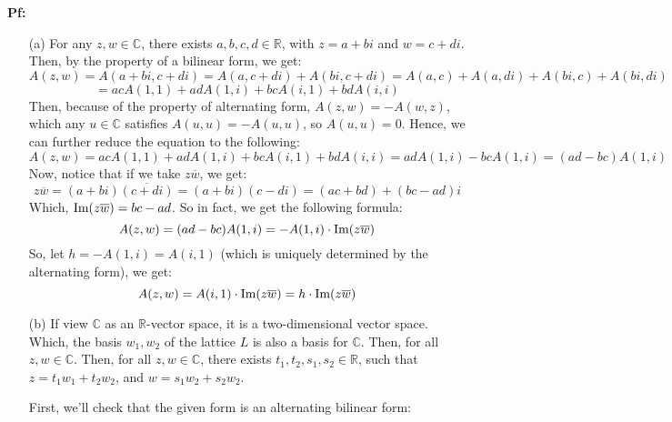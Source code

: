 \documentclass{article}
\begin{document}
\textbf{Pf:}
\begin{itemize}
    \item[(a)] For any $z,w\in \mathbb{C}$, there exists $a,b,c,d\in\mathbb{R}$, with $z=a+bi$ and $w=c+di$. Then, by the property of a bilinear form, we get:
    $$A(z,w)=A(a+bi,c+di) = A(a,c+di)+A(bi,c+di) = A(a,c)+A(a,di)+A(bi,c)+A(bi,di)$$
    $$ = acA(1,1)+adA(1,i)+bcA(i,1)+bdA(i,i)$$
    Then, because of the property of alternating form, $A(z,w)=-A(w,z)$, which any $u\in\mathbb{C}$ satisfies $A(u,u)=-A(u,u)$, so $A(u,u)=0$. Hence, we can further reduce the equation to the following:
    $$A(z,w)=acA(1,1)+adA(1,i)+bcA(i,1)+bdA(i,i) = adA(1,i)-bcA(1,i) = (ad-bc)A(1,i)$$
    Now, notice that if we take $z\overline{w}$, we get:
    $$z\overline{w} = (a+bi)\overline{(c+di)} = (a+bi)(c-di) = (ac+bd)+(bc-ad)i$$
    Which, $\textmd{Im}(z\overline{w}) = bc-ad$. So in fact, we get the following formula:
    $$A(z,w) = (ad-bc)A(1,i) = -A(1,i)\cdot \textmd{Im}(z\overline{w})$$
    So, let $h = -A(1,i)=A(i,1)$ (which is uniquely determined by the alternating form), we get:
    $$A(z,w)=A(i,1)\cdot\textmd{Im}(z\overline{w})=h\cdot\textmd{Im}(z\overline{w})$$

    \hfil

    \item[(b)] If view $\mathbb{C}$ as an $\mathbb{R}$-vector space, it is a two-dimensional vector space. Which, the basis $w_1,w_2$ of the lattice $L$ is also a basis for $\mathbb{C}$. Then, for all $z,w\in\mathbb{C}$. Then, for all $z,w\in\mathbb{C}$, there exists $t_1,t_2,s_1,s_2\in\mathbb{R}$, such that $z=t_1w_1+t_2w_2$, and $w=s_1w_2+s_2w_2$.
    
    \hfil
    
    First, we'll check that the given form is an alternating bilinear form: 
    

\end{itemize}
\end{document}
